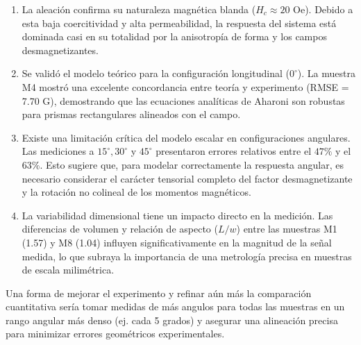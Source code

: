 \begin{enumerate}
    \item La aleación confirma su naturaleza magnética blanda ($H_c \approx 20$ Oe). Debido a esta baja coercitividad y alta permeabilidad, la respuesta del sistema está dominada casi en su totalidad por la anisotropía de forma y los campos desmagnetizantes.
    
    \item Se validó el modelo teórico para la configuración longitudinal ($0^\circ$). La muestra M4 mostró una excelente concordancia entre teoría y experimento (RMSE = 7.70 G), demostrando que las ecuaciones analíticas de Aharoni son robustas para prismas rectangulares alineados con el campo.
    
    \item Existe una limitación crítica del modelo escalar en configuraciones angulares. Las mediciones a $15^\circ, 30^\circ$ y $45^\circ$ presentaron errores relativos entre el $47\%$ y el $63\%$. Esto sugiere que, para modelar correctamente la respuesta angular, es necesario considerar el carácter tensorial completo del factor desmagnetizante y la rotación no colineal de los momentos magnéticos.
    
    \item La variabilidad dimensional tiene un impacto directo en la medición. Las diferencias de volumen y relación de aspecto ($L/w$) entre las muestras M1 (1.57) y M8 (1.04) influyen significativamente en la magnitud de la señal medida, lo que subraya la importancia de una metrología precisa en muestras de escala milimétrica.
\end{enumerate}

Una forma de mejorar el experimento y refinar aún más la comparación cuantitativa sería tomar medidas de más angulos para todas las muestras en un rango angular más denso (ej. cada 5 grados) y asegurar una alineación precisa para minimizar errores geométricos experimentales. 



\balance

